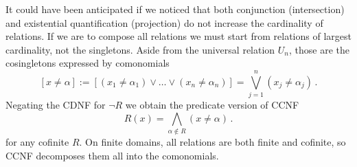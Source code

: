 \documentclass[11pt]{article}
\theoremstyle{plain}
\theoremstyle{definition}
\def\a{\alpha}
\begin{document}
It could have been anticipated if we noticed that both conjunction (intersection) and existential quantification (projection) do not increase the cardinality of relations. If we are to compose all relations we must start from relations of largest cardinality, not the singletons. Aside from the universal relation $U_n$, those are the cosingletons expressed by comonomials
\begin{equation}\label{Rcomon}
[x\neq\a]:=[(x_1\neq\a_1)\lor\dots\lor(x_n\neq\a_n)]=\bigvee_{j=1}^n(x_j\neq\a_j)\,.
\end{equation}
Negating the CDNF for $\neg R$ we obtain the predicate version of CCNF
\begin{equation}\label{RCCNF}
R(x)=\bigwedge_{\a\not\in R}(x\neq\a)\,.
\end{equation}
for any cofinite $R$. On finite domains, all relations are both finite and cofinite, so CCNF decomposes them all into the comonomials.
\end{document}

